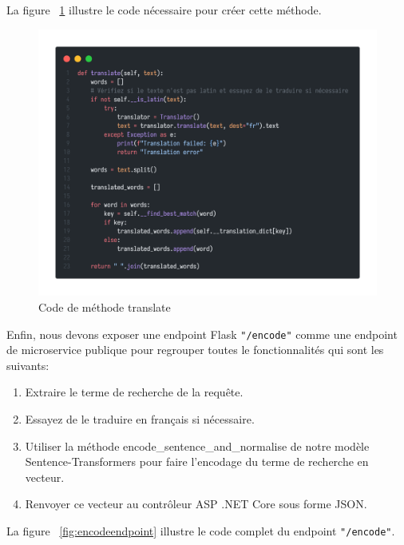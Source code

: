 \newpage
\noindent
La figure ~\ref{fig:translate} illustre le code nécessaire pour créer cette méthode.

\begin{figure}[H]
	\centering
	\includegraphics[width=1\textwidth]{logos/translate.png}
	\caption{Code de méthode translate}
	\label{fig:translate}
\end{figure}

\noindent
Enfin, nous devons exposer une endpoint Flask \texttt{"/encode"} comme une endpoint de microservice publique pour regrouper toutes le fonctionnalités qui sont les suivants:
\begin{enumerate}
	\item Extraire le terme de recherche de la requête.
	\item Essayez de le traduire en français si nécessaire.
	\item Utiliser la méthode encode\_sentence\_and\_normalise de notre modèle Sentence-Transformers pour faire l'encodage du terme de recherche en vecteur.
	\item Renvoyer ce vecteur au contrôleur ASP .NET Core sous forme JSON.
\end{enumerate}

La figure ~\ref{fig:encodeendpoint} illustre le code complet du endpoint \texttt{"/encode"}.

